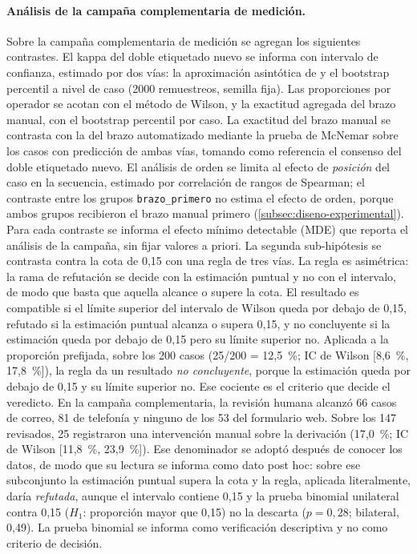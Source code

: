\paragraph{Análisis de la campaña complementaria de medición.} Sobre la campaña complementaria de medición se agregan los siguientes contrastes. El kappa del doble etiquetado nuevo se informa con intervalo de confianza, estimado por dos vías: la aproximación asintótica de \textcite{Fleiss1969_large_sample} y el bootstrap percentil a nivel de caso (2000 remuestreos, semilla fija). Las proporciones por operador se acotan con el método de Wilson, y la exactitud agregada del brazo manual, con el bootstrap percentil por caso. La exactitud del brazo manual se contrasta con la del brazo automatizado mediante la prueba de McNemar sobre los casos con predicción de ambas vías, tomando como referencia el consenso del doble etiquetado nuevo. El análisis de orden se limita al efecto de \emph{posición} del caso en la secuencia, estimado por correlación de rangos de Spearman; el contraste entre los grupos \texttt{brazo\_primero} no estima el efecto de orden, porque ambos grupos recibieron el brazo manual primero (\autoref{subsec:diseno-experimental}). Para cada contraste se informa el efecto mínimo detectable (MDE) que reporta el análisis de la campaña, sin fijar valores a priori. La segunda sub-hipótesis se contrasta contra la cota de 0,15 con una regla de tres vías. La regla es asimétrica: la rama de refutación se decide con la estimación puntual y no con el intervalo, de modo que basta que aquella alcance o supere la cota. El resultado es compatible si el límite superior del intervalo de Wilson queda por debajo de 0,15, refutado si la estimación puntual alcanza o supera 0,15, y no concluyente si la estimación queda por debajo de 0,15 pero su límite superior no. Aplicada a la proporción prefijada, sobre los 200 casos (25/200 = 12,5~\%; IC de Wilson [8,6~\%, 17,8~\%]), la regla da un resultado \emph{no concluyente}, porque la estimación queda por debajo de 0,15 y su límite superior no. Ese cociente es el criterio que decide el veredicto. En la campaña complementaria, la revisión humana alcanzó 66 casos de correo, 81 de telefonía y ninguno de los 53 del formulario web. Sobre los 147 revisados, 25 registraron una intervención manual sobre la derivación (17,0~\%; IC de Wilson [11,8~\%, 23,9~\%]). Ese denominador se adoptó después de conocer los datos, de modo que su lectura se informa como dato post hoc: sobre ese subconjunto la estimación puntual supera la cota y la regla, aplicada literalmente, daría \emph{refutada}, aunque el intervalo contiene 0,15 y la prueba binomial unilateral contra 0,15 (\(H_{1}\): proporción mayor que 0,15) no la descarta (\(p = 0{,}28\); bilateral, 0,49). La prueba binomial se informa como verificación descriptiva y no como criterio de decisión.

